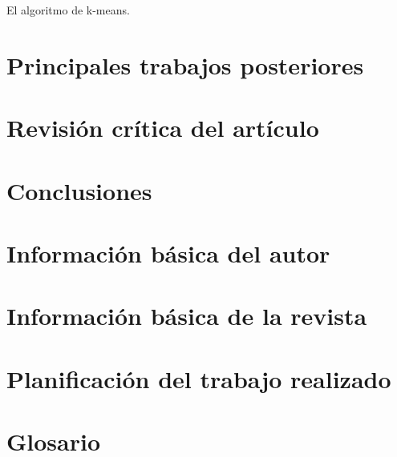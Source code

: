 \documentclass[a4paper,11pt]{report}
\begin{document}
El algoritmo de k-means.
\chapter{Principales trabajos posteriores}

\chapter{Revisión crítica del artículo}

\chapter{Conclusiones}



\begin{thebibliography}{X}















\end{thebibliography}


\chapter*{Información básica del autor}


\chapter*{Información básica de la revista}


\chapter*{Planificación del trabajo realizado}


\chapter*{Glosario}
\end{document}
